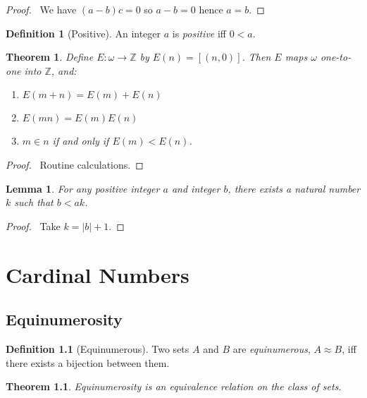 \documentclass{report}
\let\qed\relax
\newtheorem{lemma}[axiom]{Lemma}
\newtheorem{theorem}[axiom]{Theorem}
\theoremstyle{definition}
\newtheorem{definition}[axiom]{Definition}
\begin{document}
    \begin{proof}
        \pf\ We have $(a-b)c = 0$ so $a-b = 0$ hence $a = b$. \qed
    \end{proof}

    \begin{definition}[Positive]
        An integer $a$ is \emph{positive} iff $0 < a$.
    \end{definition}

    \begin{theorem}
        Define $E : \omega \rightarrow \mathbb{Z}$ by $E(n) = [(n,0)]$. Then $E$ maps $\omega$ one-to-one
        into $\mathbb{Z}$, and:
        \begin{enumerate}
            \item $E(m+n) = E(m) + E(n)$
            \item $E(mn) = E(m) E(n)$
            \item $m \in n$ if and only if $E(m) < E(n)$.
        \end{enumerate}
    \end{theorem}

    \begin{proof}
        \pf\ Routine calculations. \qed
    \end{proof}

    \begin{lemma}
        \label{lemma:integers_Archimedean}
        For any positive integer $a$ and integer $b$, there exists a natural number $k$ such that
        $b < ak$.
    \end{lemma}

    \begin{proof}
        \pf\ Take $k = |b| + 1$. \qed
    \end{proof}

    \chapter{Cardinal Numbers}

    \section{Equinumerosity}

    \begin{definition}[Equinumerous]
        Two sets $A$ and $B$ are \emph{equinumerous}, $A \approx B$, iff there exists a bijection between
        them.
    \end{definition}

    \begin{theorem}
        Equinumerosity is an equivalence relation on the class of sets.
    \end{theorem}
\end{document}
